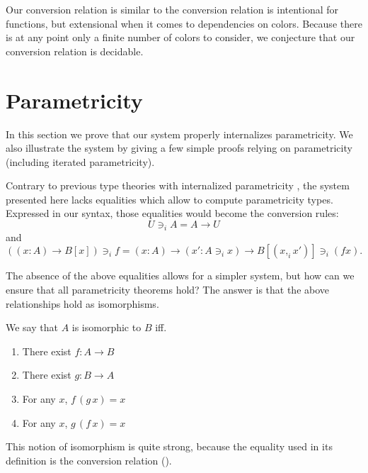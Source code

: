 \documentclass[english]{PaperTools/latex/lipics}
\newcommand\CP[3]{(#2,_{#1} #3)}
\newcommand\op[1]{∋_{#1}}
\begin{document}
Our conversion relation is similar to the conversion relation is
intentional for functions, but extensional when it comes to
dependencies on colors. Because there is at any point only a finite
number of colors to consider, we conjecture that our conversion
relation is decidable.

\section{Parametricity}
\label{sec:parametricity}
In this section we prove that our system properly internalizes
parametricity. We also illustrate the system by giving a few simple
proofs relying on parametricity (including iterated parametricity).

Contrary to previous type theories with internalized parametricity
\citep{bernardy_computational_2012, bernardy_type-theory_2013}, the
system presented here lacks equalities which allow to compute
parametricity types. Expressed in our syntax, those equalities would become the conversion rules:
$$U \op i A = A → U$$
and
$$((x:A) → B[x]) \op i f = (x:A) → (x' : A \op i x) → B[\CP i x {x'}] \op i (f x).$$

The absence of the above equalities allows for a simpler system, but
how can we ensure that all parametricity theorems hold?  The answer is
that the above relationships hold as isomorphisms.

We say that $A$ is isomorphic to $B$ iff.
\begin{enumerate}
  \item There exist $f : A → B$
  \item There exist $g : B → A$
  \item For any $x$, $f\, (g\, x) = x$
  \item For any $x$, $g\, (f\, x) = x$
\end{enumerate}
This notion of isomorphism is quite strong, because the equality used
in its definition is the conversion relation ().
\end{document}
